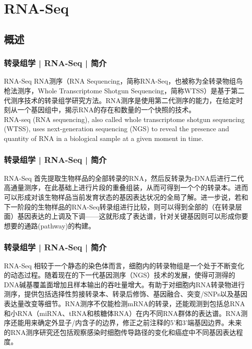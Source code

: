 \section{RNA-Seq}
\subsection{概述}
\begin{frame}
  \frametitle{转录组学 | RNA-Seq | 简介}
  \begin{block}{RNA-Seq}
 RNA测序（RNA Sequencing，简称RNA-Seq，也被称为全转录物组鸟枪法测序，Whole Transcriptome Shotgun Sequencing，简称WTSS）是基于第二代测序技术的转录组学研究方法。RNA测序是使用第二代测序的能力，在给定时刻从一个基因组中，揭示RNA的存在和数量的一个快照的技术。\\
 \vspace{1em}
RNA-seq (RNA sequencing), also called whole transcriptome shotgun sequencing (WTSS), uses next-generation sequencing (NGS) to reveal the presence and quantity of RNA in a biological sample at a given moment in time.
  \end{block}
\end{frame}

\begin{frame}
  \frametitle{转录组学 | RNA-Seq | 简介}
  \begin{block}{RNA-Seq}
首先提取生物样品的全部转录的RNA，然后反转录为cDNA后进行二代高通量测序，在此基础上进行片段的重叠组装，从而可得到一个个的转录本。进而可以形成对该生物样品当前发育状态的基因表达状况的全局了解。进一步说，若和下一阶段的生物样品的RNA-Seq转录组进行比较，则可以得到全部的（在转录层面）基因表达的上调及下调——这就形成了表达谱，针对关键基因则可以形成你要想要的通路(pathway)的构建。
  \end{block}
\end{frame}

\begin{frame}
  \frametitle{转录组学 | RNA-Seq | 简介}
  \begin{block}{RNA-Seq}
相较于一个静态的染色体而言，细胞内的转录物组是一个处于不断变化的动态过程。随着现在的下一代基因测序（NGS）技术的发展，使得可测得的DNA碱基覆盖面增加且样本输出的吞吐量增大。有助于对细胞内RNA转录物进行测序，提供包括选择性剪接转录本、转录后修饰、基因融合、突变/SNPs以及基因表达量改变等细节。RNA测序不仅能检测mRNA的转录，还能观测到包括总RNA和小RNA（miRNA、tRNA和核糖体RNA）在内不同RNA群体的表达谱。RNA测序还能用来确定外显子/内含子的边界，修正之前注释的5'和3'端基因边界。未来的RNA测序研究还包括观察感染时细胞传导路径的变化和癌症中不同基因表达程度。
  \end{block}
\end{frame}

